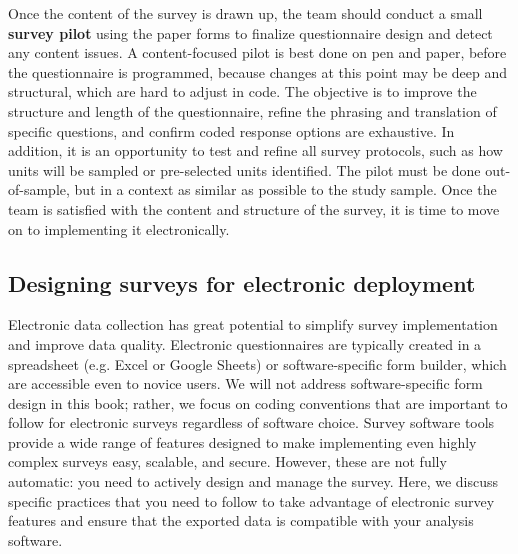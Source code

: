 Once the content of the survey is drawn up,
the team should conduct a small \textbf{survey pilot}
using the paper forms to finalize questionnaire design and detect any content issues.
A content-focused pilot
is best done on pen and paper, before the questionnaire is programmed,
because changes at this point may be deep and structural, which are hard to adjust in code.
The objective is to improve the structure and length of the questionnaire,
refine the phrasing and translation of specific questions,
and confirm coded response options are exhaustive.
In addition, it is an opportunity to test and refine all survey protocols,
such as how units will be sampled or pre-selected units identified.
The pilot must be done out-of-sample,
but in a context as similar as possible to the study sample.
Once the team is satisfied with the content and structure of the survey,
it is time to move on to implementing it electronically.

\subsection{Designing surveys for electronic deployment}

Electronic data collection has great potential to simplify survey implementation and improve data quality.
Electronic questionnaires are typically created in a spreadsheet (e.g. Excel or Google Sheets)
or software-specific form builder, which are accessible even to novice users.
We will not address software-specific form design in this book;
rather, we focus on coding conventions that are important to follow
for electronic surveys regardless of software choice.
Survey software tools provide a wide range of features
designed to make implementing even highly complex surveys easy, scalable, and secure.
However, these are not fully automatic: you need to actively design and manage the survey.
Here, we discuss specific practices that you need to follow
to take advantage of electronic survey features
and ensure that the exported data is compatible with your analysis software.

